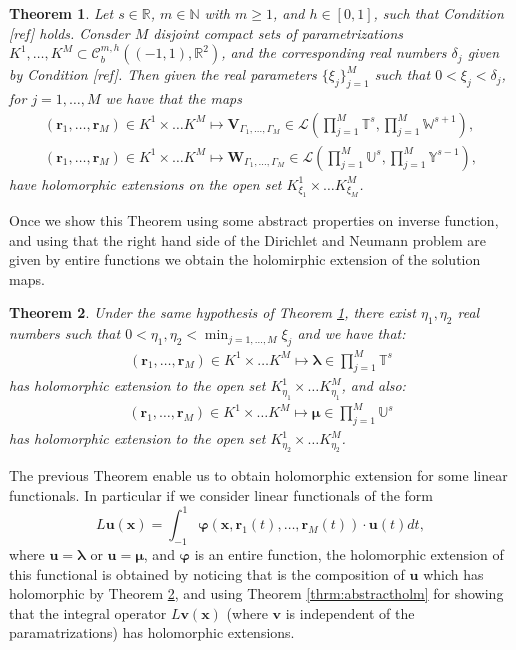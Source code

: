 \documentclass{article}
\newtheorem{theorem}{Theorem}[section]
\newcommand{\todo}[1]{{\color{red}[#1]}}
\newcommand{\bmu} {\bm{\mu}}
\newcommand{\IN}{{\mathbb N}}
\newcommand{\IR}{{\mathbb R}}
\newcommand{\IU}{{\mathbb U}}
\newcommand{\IT}{{\mathbb T}}
\newcommand{\IW}{{\mathbb W}}
\newcommand{\IY}{{\mathbb Y}}
\newcommand{\rgeoh}[2]{\mathcal{C}_b^{#1,#2}\left( (-1,1), \IR^2 \right)}
\newcommand{\bla}{\boldsymbol \lambda}
\newcommand{\bu}{\bm{u}}
\newcommand{\bv}{\bm{v}}
\newcommand{\br}{\bm{r}}
\newcommand{\bx}{\bm{x}}
\begin{document}
\begin{theorem}
\label{thrm:biohlmextension}
Let $s \in \IR$, $m \in \IN$ with $m \geq 1$, and $h \in [0,1]$, such that Condition \todo{ref} holds. Consder $M$ disjoint compact sets of parametrizations $K^1,\hdots,K^M \subset \rgeoh{m}{h}$, and the corresponding real numbers $\delta_j$ given by Condition  \todo{ref}. Then given the real parameters $\{\xi_j\}_{j=1}^M$ such that $0 < \xi_j < \delta_j$, for $j=1,\hdots,M$ we have that the maps 
\begin{align*}
(\br_1,\hdots,\br_M) \in K^1 \times \hdots K^M \mapsto \mathbf{V}_{\Gamma_1, \hdots,\Gamma_M} \in \mathcal{L} \left(  \prod_{j=1}^M \IT^s, \prod_{j=1}^M \IW^{s+1}
\right)
,\\
(\br_1,\hdots,\br_M) \in K^1 \times \hdots K^M \mapsto \mathbf{W}_{\Gamma_1, \hdots,\Gamma_M} \in \mathcal{L} \left(  \prod_{j=1}^M \IU^s, \prod_{j=1}^M \IY^{s-1}
\right)
,
\end{align*}
have holomorphic extensions on the open set $K^1_{\xi_1}\times\hdots K^M_{\xi_M}$.
\end{theorem}
Once we show this Theorem using some abstract properties on inverse function, and using that the right hand side of the Dirichlet and Neumann problem are given by entire functions we obtain the holomirphic extension of the solution maps. 
\begin{theorem}
\label{thrm:solutionholomrext}
Under the same hypothesis of Theorem \ref{thrm:biohlmextension}, there exist $\eta_1,\eta_2$ real numbers such that
$0<\eta_1,\eta_2< \min_{j=1,\hdots,M}\xi_j$ and we have that: 
\begin{align*}
(\br_1,\hdots,\br_M) \in K^1 \times \hdots K^M \mapsto  \bla \in \prod_{j=1}^M \IT^s
\end{align*}
has holomorphic extension to the open set $K_{\eta_1}^1 \times \hdots K_{\eta_1}^M$, and also: 
\begin{align*}
(\br_1,\hdots,\br_M) \in K^1 \times \hdots K^M \mapsto  \bmu \in \prod_{j=1}^M \IU^s
\end{align*}
has holomorphic extension to the open set $K_{\eta_2}^1 \times \hdots K_{\eta_2}^M$.
\end{theorem}
The previous Theorem enable us to obtain holomorphic extension for some linear functionals. In particular if we consider linear functionals of the form  $$L\bu (\bx) = \int_{-1}^{1} \mathbf{\varphi}(\bx,\br_1(t),\hdots,\br_M(t)) \cdot \bu(t) dt,$$ where $\bu = \bla $ or $\bu = \bmu$, and $\mathbf{\varphi}$ is an entire function, the holomorphic extension of this functional is obtained by noticing that is the composition of $\bu$ which has holomorphic by Theorem \ref{thrm:solutionholomrext}, and using Theorem \ref{thrm:abstractholm} for showing that the integral operator 
$L\bv(\bx)$ (where $\bv$ is independent of the paramatrizations) has holomorphic extensions. 
\end{document}
